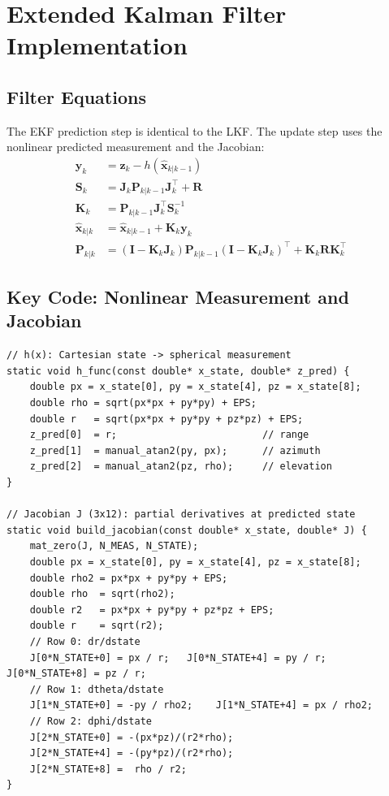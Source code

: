 \documentclass[12pt,a4paper]{article}
\newcommand{\bP}{\mathbf{P}}
\newcommand{\bK}{\mathbf{K}}
\newcommand{\bR}{\mathbf{R}}
\newcommand{\bI}{\mathbf{I}}
\newcommand{\bz}{\mathbf{z}}
\newcommand{\by}{\mathbf{y}}
\newcommand{\bJ}{\mathbf{J}}
\begin{document}
\section{Extended Kalman Filter Implementation}

\subsection{Filter Equations}
The EKF prediction step is identical to the LKF. The update step uses the
nonlinear predicted measurement and the Jacobian:
\begin{align}
    \by_k      &= \bz_k - h(\hat{\mathbf{x}}_{k|k-1}) \\
    \mathbf{S}_k &= \bJ_k \bP_{k|k-1} \bJ_k^\top + \bR \\
    \bK_k      &= \bP_{k|k-1}\bJ_k^\top \mathbf{S}_k^{-1} \\
    \hat{\mathbf{x}}_{k|k} &= \hat{\mathbf{x}}_{k|k-1} + \bK_k \by_k \\
    \bP_{k|k}  &= (\bI - \bK_k\bJ_k)\bP_{k|k-1}(\bI - \bK_k\bJ_k)^\top + \bK_k\bR\bK_k^\top
\end{align}

\subsection{Key Code: Nonlinear Measurement and Jacobian}
\begin{lstlisting}[caption={Nonlinear measurement function h(x) and Jacobian}]
// h(x): Cartesian state -> spherical measurement
static void h_func(const double* x_state, double* z_pred) {
    double px = x_state[0], py = x_state[4], pz = x_state[8];
    double rho = sqrt(px*px + py*py) + EPS;
    double r   = sqrt(px*px + py*py + pz*pz) + EPS;
    z_pred[0]  = r;                         // range
    z_pred[1]  = manual_atan2(py, px);      // azimuth
    z_pred[2]  = manual_atan2(pz, rho);     // elevation
}

// Jacobian J (3x12): partial derivatives at predicted state
static void build_jacobian(const double* x_state, double* J) {
    mat_zero(J, N_MEAS, N_STATE);
    double px = x_state[0], py = x_state[4], pz = x_state[8];
    double rho2 = px*px + py*py + EPS;
    double rho  = sqrt(rho2);
    double r2   = px*px + py*py + pz*pz + EPS;
    double r    = sqrt(r2);
    // Row 0: dr/dstate
    J[0*N_STATE+0] = px / r;   J[0*N_STATE+4] = py / r;   J[0*N_STATE+8] = pz / r;
    // Row 1: dtheta/dstate
    J[1*N_STATE+0] = -py / rho2;    J[1*N_STATE+4] = px / rho2;
    // Row 2: dphi/dstate
    J[2*N_STATE+0] = -(px*pz)/(r2*rho);
    J[2*N_STATE+4] = -(py*pz)/(r2*rho);
    J[2*N_STATE+8] =  rho / r2;
}
\end{lstlisting}
\end{document}
